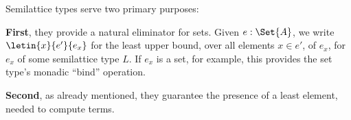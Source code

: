 \begin{enumerate}
  Semilattice types serve two primary purposes:

  \textbf{First}, they provide a natural eliminator for sets. Given $e :
  \Set{A}$, we write $\letin{x}{e'}{e_x}$ for the least upper bound, over all
  elements $x \in e'$, of $e_x$, for $e_x$ of some semilattice type $L$. If
  $e_x$ is a set, for example, this provides the set type's monadic ``bind''
  operation.%



  \textbf{Second}, as already mentioned, they guarantee the presence of a least
  element, needed to compute  terms.


\end{enumerate}
